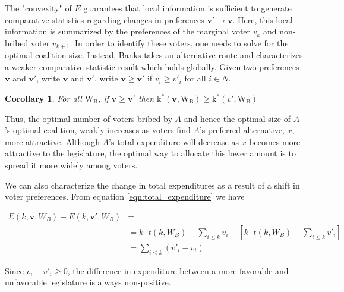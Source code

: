 \documentclass[12pt,a4paper]{article}
\newtheorem{corollary}{Corollary}
\begin{document}
The "convexity" of $E$ guarantees that local information is sufficient to generate comparative statistics regarding changes in preferences $\mathbf{v}' \rightarrow \mathbf{v}$. Here, this local information is summarized by the preferences of the marginal voter $v_k$ and non-bribed voter $v_{k + 1}$. In order to identify these voters, one needs to solve for the optimal coalition size. Instead, Banks takes an alternative route and characterizes a weaker comparative statistic result which holds globally. Given two preferences $\mathbf{v}$ and $\mathbf{v}'$, write $\mathbf{v}$ and $\mathbf{v}'$, write $\mathbf{v} \geq \mathbf{v}'$ if $v_i \geq v'_i$ for all $i \in N$.

\begin{corollary}
    \label{cor:change_k}
    For all $\mathrm{W_B}$, if $\mathbf{v} \geq \mathbf{v}'$ then $\mathrm{k}^*(\mathbf{v}, \mathrm{W_B}) \geq \mathrm{k}^*(v', \mathrm{W_B})$
\end{corollary}

Thus, the optimal number of voters bribed by $A$ and hence the optimal size of $A$'s optimal coalition, weakly increases as voters find $A$'s preferred alternative, $x$, more attractive. Although $A$'s total expenditure will decrease as $x$ becomes more attractive to the legislature, the optimal way to allocate this lower amount is to spread it more widely among voters.

We can also characterize the change in total expenditures as a result of a shift in voter preferences. From equation \ref{eqn:total_expenditure} we have

\begin{align*}
    E(k, \mathbf{v}, W_B) - E(k, \mathbf{v}', W_B) & = \\
    &= k \cdot t(k, W_B) - \sum_{i \leq k} v_i - \left[k \cdot t(k, W_B) - \sum_{i \leq k} v'_i\right]\\
    &= \sum_{i \leq k}(v'_i - v_i)
\end{align*}

Since $v_i - v'_i \geq 0$, the difference in expenditure between a more favorable and unfavorable legislature is always non-positive.
\end{document}

